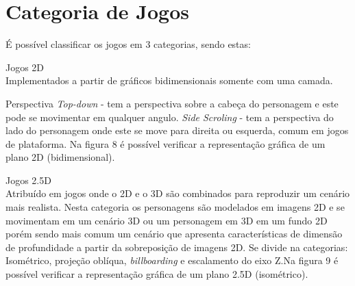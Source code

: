 \pagebreak
\section{Categoria de Jogos}
\label{sec:categoria-de-jogos}

É possível classificar os jogos em 3 categorias, sendo estas:
\begin{alineascomponto}

\item Jogos 2D\\
Implementados a partir de gráficos bidimensionais somente com uma camada.

 Perspectiva \textit{ Top-down} - tem a perspectiva sobre a cabeça do personagem e este pode se movimentar em qualquer angulo.
 \textit{Side Scroling} - tem a perspectiva do lado do personagem onde este se move para direita ou esquerda, comum em jogos de plataforma. Na figura 8 é possível verificar a representação gráfica de um plano 2D (bidimensional).

\end{alineascomponto}


\begin{figure}[h!]
		\centering
	\end{figure}

\begin{alineascomponto}
\item Jogos 2.5D\\
Atribuído em jogos onde o 2D e o 3D são combinados para reproduzir um cenário mais realista. Nesta categoria os personagens são modelados em imagens 2D e se movimentam em um cenário 3D ou um personagem em 3D em um fundo 2D porém sendo mais comum um cenário que apresenta características de dimensão de profundidade a partir da sobreposição de imagens 2D.
Se divide na categorias: Isométrico, projeção oblíqua, \textit{billboarding} e escalamento do eixo Z.Na figura 9 é possível verificar a representação gráfica de um plano 2.5D (isométrico). 

\end{alineascomponto}

